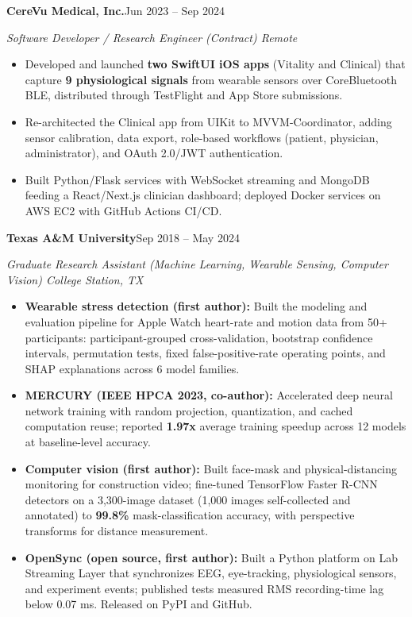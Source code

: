 \documentclass[letterpaper,10pt]{article}
\newcommand{\role}[3]{\par\addvspace{3pt}\needspace{5\baselineskip}\textbf{#1}\hfill #3\par{\itshape #2}\par}
\begin{document}
\role{CereVu Medical, Inc.}{Software Developer / Research Engineer (Contract) \textbar{} Remote}{Jun 2023 -- Sep 2024}
\begin{itemize}
\item Developed and launched \textbf{two SwiftUI iOS apps} (Vitality and Clinical) that capture \textbf{9 physiological signals} from wearable sensors over CoreBluetooth BLE, distributed through TestFlight and App Store submissions.
\item Re-architected the Clinical app from UIKit to MVVM-Coordinator, adding sensor calibration, data export, role-based workflows (patient, physician, administrator), and OAuth 2.0/JWT authentication.
\item Built Python/Flask services with WebSocket streaming and MongoDB feeding a React/Next.js clinician dashboard; deployed Docker services on AWS EC2 with GitHub Actions CI/CD.
\end{itemize}

\role{Texas A\&M University}{Graduate Research Assistant (Machine Learning, Wearable Sensing, Computer Vision) \textbar{} College Station, TX}{Sep 2018 -- May 2024}
\begin{itemize}
\item \textbf{Wearable stress detection (first author):} Built the modeling and evaluation pipeline for Apple Watch heart-rate and motion data from 50+ participants: participant-grouped cross-validation, bootstrap confidence intervals, permutation tests, fixed false-positive-rate operating points, and SHAP explanations across 6 model families.
\item \textbf{MERCURY (IEEE HPCA 2023, co-author):} Accelerated deep neural network training with random projection, quantization, and cached computation reuse; reported \textbf{1.97x} average training speedup across 12 models at baseline-level accuracy.
\item \textbf{Computer vision (first author):} Built face-mask and physical-distancing monitoring for construction video; fine-tuned TensorFlow Faster R-CNN detectors on a 3,300-image dataset (1,000 images self-collected and annotated) to \textbf{99.8\%} mask-classification accuracy, with perspective transforms for distance measurement.
\item \textbf{OpenSync (open source, first author):} Built a Python platform on Lab Streaming Layer that synchronizes EEG, eye-tracking, physiological sensors, and experiment events; published tests measured RMS recording-time lag below 0.07 ms. Released on PyPI and GitHub.
\end{itemize}
\end{document}
